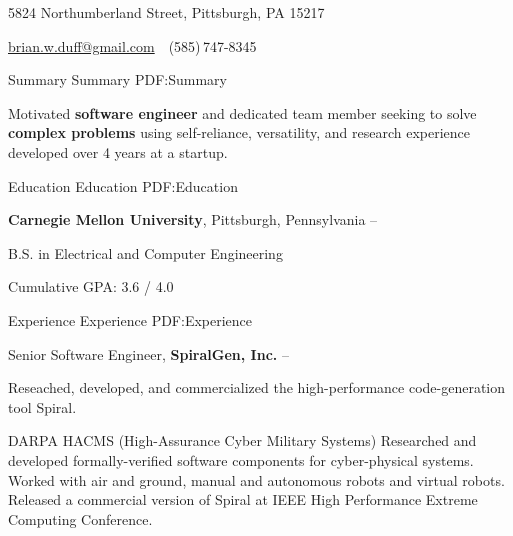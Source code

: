 \documentclass[letterpaper,MMMyyyy,nonstopmode]{simpleresumecv}
\newcommand{\CVAuthor}{Brian W. Duff}
\begin{document}

\Title{\CVAuthor}

\begin{SubTitle}
5824 Northumberland Street, Pittsburgh, PA 15217
\par
\href{mailto:brian.w.duff@gmail.com}
{brian.w.duff@gmail.com}
\,\SubBulletSymbol\,
(585)\,747-8345
\end{SubTitle}

\begin{Body}


\Section
{Summary}
{Summary}
{PDF:Summary}

\Entry
Motivated \textbf{software engineer} and dedicated team member seeking to solve \textbf{complex problems} using self-reliance, versatility, and research experience developed over 4 years at a startup. 



\Section
{Education}
{Education}
{PDF:Education}

\Entry
\textbf{Carnegie Mellon University},
Pittsburgh, Pennsylvania
\hfill
{} --


\Gap
\BulletItem
B.S. in
Electrical and Computer Engineering
\begin{Detail}
\SubBulletItem
Cumulative GPA: 3.6 / 4.0
\end{Detail}




\Section
{Experience}
{Experience}
{PDF:Experience}

\Entry
Senior Software Engineer,
\textbf{SpiralGen, Inc.}
\hfill
{} --

\BigGap
Reseached, developed, and commercialized the high-performance code-generation tool Spiral.

\BigGap

\BulletItem
DARPA HACMS (High-Assurance Cyber Military Systems)
\SubBulletItem
Researched and developed formally-verified software components for cyber-physical systems.
\SubBulletItem
Worked with air and ground, manual and autonomous robots and virtual robots.
\SubBulletItem
Released a commercial version of Spiral at IEEE High Performance Extreme Computing Conference.


\end{Body}
\end{document}
